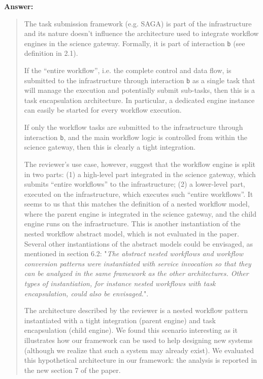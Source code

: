 \documentclass[a4]{article}
\newenvironment{answer}%
{\textbf{Answer:}\begin{small}\begin{quote}}%
{\end{quote}\end{small}}%
\begin{document}
\begin{answer}
  The task submission framework (e.g. SAGA) is part of the infrastructure
  and its nature doesn't influence the architecture used to integrate
  workflow engines in the science gateway. Formally, it is part of
  interaction \texttt{b} (see definition in 2.1).

  If the ``entire workflow'', i.e. the complete control and data flow,
  is submitted to the infrastructure through interaction \texttt{b} as
  a single task that will manage the execution and potentially submit
  sub-tasks, then this is a task encapsulation architecture. In
  particular, a dedicated engine instance can easily be started for
  every workflow execution.

  If only the workflow tasks are submitted to the infrastructure
  through interaction \texttt{b}, and the main workflow logic is
  controlled from within the science gateway, then this is clearly a
  tight integration.

  The reviewer's use case, however, suggest that the workflow engine
  is split in two parts: (1) a high-level part integrated in the
  science gateway, which submits ``entire workflows'' to the
  infrastructure; (2) a lower-level part, executed on the
  infrastructure, which executes such ``entire workflows''. It seems
  to us that this matches the definition of a nested workflow model,
  where the parent engine is integrated in the science gateway, and
  the child engine runs on the infrastructure. This is another
  instantiation of the nested workflow abstract model, which is not
  evaluated in the paper. Several other instantiations of the abstract
  models could be envisaged, as mentioned in section 6.2: "\emph{The
    abstract nested workflows and workflow conversion patterns were
    instantiated with service invocation so that they can be analyzed
    in the same framework as the other architectures. Other types of
    instantiation, for instance nested workflows with task
    encapsulation, could also be envisaged.}".

  The architecture described by the reviewer is a nested workflow
  pattern instantiated with a tight integration (parent engine) and
  task encapsulation (child engine). We found this scenario
  interesting as it illustrates how our framework can be used to help
  designing new systems (although we realize that such a system may
  already exist). We evaluated this hypothetical architecture in our
  framework: the analysis is reported in the new section 7 of the
  paper.
\end{answer}
\end{document}
